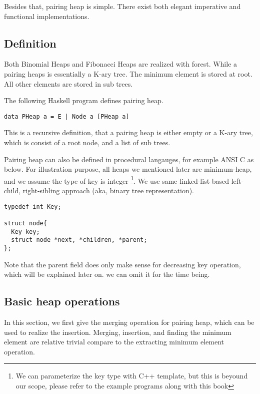 \documentclass{article}
\begin{document}
Besides that, pairing heap is simple. There exist both elegant 
imperative and functional implementations. 

\subsection{Definition}
\label{pairing-heap!definition}

Both Binomial Heaps and Fibonacci Heaps are realized with forest. 
While a pairing heaps is essentially a K-ary tree. The minimum element
is stored at root. All other elements are stored in sub trees.

The following Haskell program defines pairing heap.

\lstset{language=Haskell}
\begin{lstlisting}
data PHeap a = E | Node a [PHeap a]
\end{lstlisting}

This is a recursive definition, that a pairing heap is either empty
or a K-ary tree, which is consist of a root node, and a list of sub trees.

Pairing heap can also be defined in procedural langauges, for example
ANSI C as below. For illustration purpose, all heaps we mentioned later
are minimum-heap, and we assume the type of key is integer \footnote{We
can parameterize the key type with C++ template, but this is beyound
our scope, please refer to the example programs along with
this book}. We use same linked-list based left-child, right-sibling 
approach (aka, binary tree representation\cite{CLRS}).

\lstset{language=C}
\begin{lstlisting}
typedef int Key;

struct node{
  Key key;
  struct node *next, *children, *parent;
};
\end{lstlisting}

Note that the parent field does only make sense for decreasing key
operation, which will be explained later on. we can omit it for the
time being. 


\subsection{Basic heap operations}
In this section, we first give the merging operation for pairing
heap, which can be used to realize the insertion. Merging, insertion,
and finding the minimum element are relative trivial compare to
the extracting minimum element operation.
\end{document}
